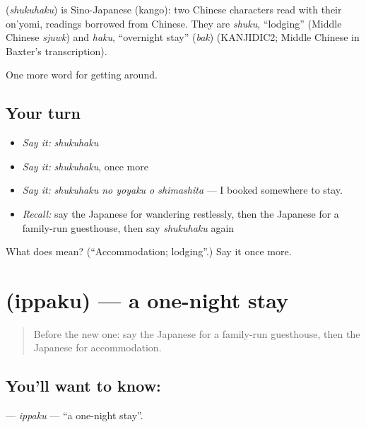 \begin{cousinweb}
\textbf{} (\emph{shukuhaku}) is Sino-Japanese (kango): two Chinese characters read with their on'yomi, readings borrowed from Chinese. They are \emph{shuku}, \textquotedblleft{}lodging\textquotedblright{} (Middle Chinese \emph{sjuwk}) and \emph{haku}, \textquotedblleft{}overnight stay\textquotedblright{} (\emph{bak}) (KANJIDIC2; Middle Chinese in Baxter's transcription).
\end{cousinweb}

\begin{grammarlens}[title={What you've built}]
One more word for getting around.
\end{grammarlens}

\subsection*{Your turn}
\begin{itemize}
\raggedright
  \item \emph{Say it:} \emph{shukuhaku}
  \item \emph{Say it:} \emph{shukuhaku}, once more
  \item \emph{Say it:} \emph{shukuhaku no yoyaku o shimashita} — I booked somewhere to stay.
  \item \emph{Recall:} say the Japanese for wandering restlessly, then the Japanese for a family-run guesthouse, then say \emph{shukuhaku} again
\end{itemize}

\begin{tcolorbox}[breakable,colback=teal!4,colframe=teal!35!black,title={Before you move on}]
What does  mean? (\textquotedblleft{}Accommodation; lodging\textquotedblright{}.) Say it once more.
\end{tcolorbox}
\section[\texorpdfstring{\ja{いっぱく} (ippaku)}{いっぱく (ippaku)}]{ (ippaku) — a one-night stay}

\label{lesson:JA-C397-ippaku}



\begin{quote}
Before the new one: say the Japanese for a family-run guesthouse, then the Japanese for accommodation.
\end{quote}

\subsection*{You'll want to know: }
\textbf{} — \emph{ippaku} — \textquotedblleft{}a one-night stay\textquotedblright{}.


